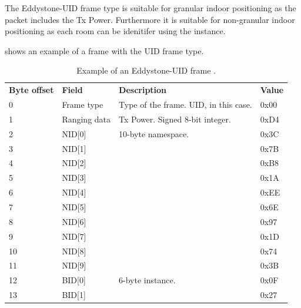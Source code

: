 The Eddystone-UID frame type is suitable for granular indoor positioning as the packet includes the Tx Power. Furthermore it is suitable for non-granular indoor positioning as each room can be idenitifer using the instance.

 shows an example of a frame with the UID frame type.

\begin{table}[h!]
\centering
\caption{Example of an Eddystone-UID frame \cite{eddystone:protocol-uid-spec}.}
\label{tbl:design:ble-positioning:eddystone-uid}
\begin{tabular}{llll}
\textbf{Byte offset} & \textbf{Field} & \textbf{Description}                  & \textbf{Value} \\
0                    & Frame type     & Type of the frame. UID, in this case. & 0x00           \\
1                    & Ranging data   & Tx Power. Signed 8-bit integer.       & 0xD4           \\
2                    & NID{[}0{]}     & 10-byte namespace.                    & 0x3C           \\
3                    & NID{[}1{]}     &                                       & 0x7B           \\
4                    & NID{[}2{]}     &                                       & 0xB8           \\
5                    & NID{[}3{]}     &                                       & 0x1A           \\
6                    & NID{[}4{]}     &                                       & 0xEE           \\
7                    & NID{[}5{]}     &                                       & 0x6E           \\
8                    & NID{[}6{]}     &                                       & 0x97           \\
9                    & NID{[}7{]}     &                                       & 0x1D           \\
10                   & NID{[}8{]}     &                                       & 0x74           \\
11                   & NID{[}9{]}     &                                       & 0x3B           \\
12                   & BID{[}0{]}     & 6-byte instance.                      & 0x0F           \\
13                   & BID{[}1{]}     &                                       & 0x27           \\

\end{tabular}
\end{table}
